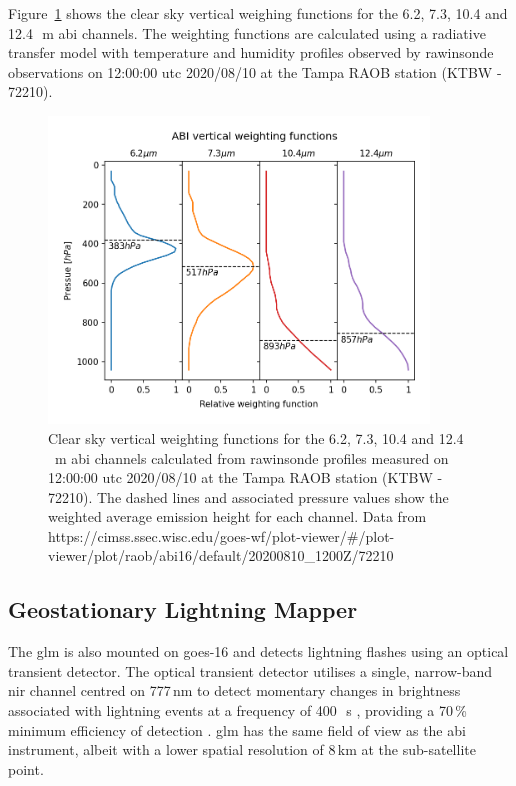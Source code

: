 Figure~\ref{fig:abi_vertical_weighting} shows the clear sky vertical weighing functions for the 6.2, 7.3, 10.4 and 12.4\,\unit{\mu m} \acrshort{abi} channels.
The weighting functions are calculated using a radiative transfer model with temperature and humidity profiles observed by rawinsonde observations on 12:00:00 \acrshort{utc} 2020/08/10 at the Tampa RAOB station (KTBW - 72210). 


\begin{figure}[tp]
    \includegraphics[width=0.9\textwidth]{figures/chapter1_04.png}
    \caption[
    Clear sky vertical weighting functions for the 6.2, 7.3, 10.4 and 12.4\,\unit{\mu m} \acrshort{abi} channels
    ]{
    Clear sky vertical weighting functions for the 6.2, 7.3, 10.4 and 12.4\,\unit{\mu m} \acrshort{abi} channels calculated from rawinsonde profiles measured on 12:00:00 \acrshort{utc} 2020/08/10 at the Tampa RAOB station (KTBW - 72210). The dashed lines and associated pressure values show the weighted average emission height for each channel. Data from {https://cimss.ssec.wisc.edu/goes-wf/plot-viewer/\#/plot-viewer/plot/raob/abi16/default/20200810\_1200Z/72210}
    }
    \label{fig:abi_vertical_weighting}
\end{figure}


\subsection{Geostationary Lightning Mapper}

The \acrshort{glm} is also mounted on \acrshort{goes}-16 and detects lightning flashes using an optical transient detector.
The optical transient detector utilises a single, narrow-band \acrshort{nir} channel centred on 777\,\unit{nm} \citep{orville_absolute_1984} to detect momentary changes in brightness associated with lightning events at a frequency of 400\,\unit{\mu s} \citep{christian_global_2003}, providing a 70\,\% minimum efficiency of detection \citep{goodman_goes-r_2013}.
\acrshort{glm} has the same field of view as the \acrshort{abi} instrument, albeit with a lower spatial resolution of 8\,\unit{km} at the sub-satellite point.

